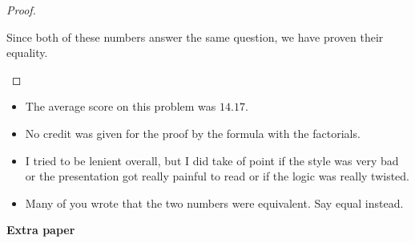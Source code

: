 \documentclass[12pt]{article}
\begin{document}
\begin{enumerate}
\begin{proof}
\begin{itemize}
Since both of these numbers answer the same question, we have proven their equality.
\end{itemize}
\end{proof}

\begin{itemize}
 \item The average score on this problem was $14.17$.
 \item No credit was given for the proof by the formula with the factorials.
 \item I tried to be lenient overall, but I did take of point if the style was very bad or the presentation got really painful to read or if the logic was really twisted.
 \item Many of you wrote that the two numbers were equivalent. Say equal instead.
\end{itemize}
\end{enumerate}

\newpage
\noindent
\textbf{Extra paper}
%

%
\end{document}
